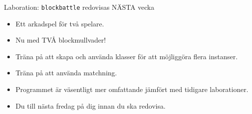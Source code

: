 \begin{SlideExtra}{Laboration: \texttt{blockbattle} redovisas NÄSTA vecka}
\begin{minipage}{0.59\textwidth}
    \begin{itemize}
      \item Ett arkadspel för två spelare.
      \item Nu med TVÅ blockmullvader!
      \item Träna på att skapa och använda klasser för att möjliggöra flera instanser.
      \item Träna på att använda matchning.
      \item Programmet är väsentligt mer omfattande jämfört med tidigare laborationer.
      \item Du till nästa fredag på dig innan du ska redovisa.
    \end{itemize}    
  \end{minipage}
\end{SlideExtra}
  
\fi
